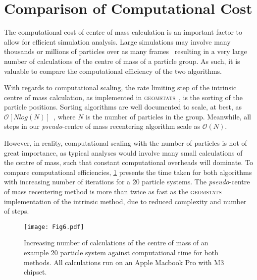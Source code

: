 \documentclass[reprint,superscriptaddress,nobibnotes,amsmath,amssymb,aip]{revtex4-2}
\begin{document}
\section{Comparison of Computational Cost}
\label{app:complex}

The computational cost of centre of mass calculation is an important factor to allow for efficient simulation analysis. 
Large simulations may involve many thousands or millions of particles over as many frames~\cite{lu_pflops_2021,stevens_molecular_2023} resulting in a very large number of calculations of the centre of mass of a particle group.
As such, it is valuable to compare the computational efficiency of the two algorithms. 

With regards to computational scaling, the rate limiting step of the intrinsic centre of mass calculation, as implemented in \textsc{geomstats}~\cite{miolane_geomstats_2020}, is the sorting of the particle positions. 
Sorting algorithms are well documented to scale, at best, as $\mathcal{O}[N log(N)]$~\cite{knuth_sorting_1998}, where $N$ is the number of particles in the group.
Meanwhile, all steps in our \emph{pseudo}-centre of mass recentering algorithm scale as $\mathcal{O}(N)$. 

However, in reality, computational scaling with the number of particles is not of great importance, as typical analyses would involve many small calculations of the centre of mass, such that constant computational overheads will dominate. 
To compare computational efficiencies, \cref{fig:comp_efficiency} presents the time taken for both algorithms with increasing number of iterations for a \num{20} particle systems.
The \emph{pseudo}-centre of mass recentering method is more than twice as fast as the \textsc{geomstats} implementation of the intrinsic method, due to reduced complexity and number of steps. 
%
\begin{figure}
    \centering
    \texttt{[image: Fig6.pdf]}
    \caption{Increasing number of calculations of the centre of mass of an example 20 particle system against computational time for both methods. 
    All calculations run on an Apple Macbook Pro with M3 chipset.}
    \label{fig:comp_efficiency}
\end{figure}
%



\end{document}
